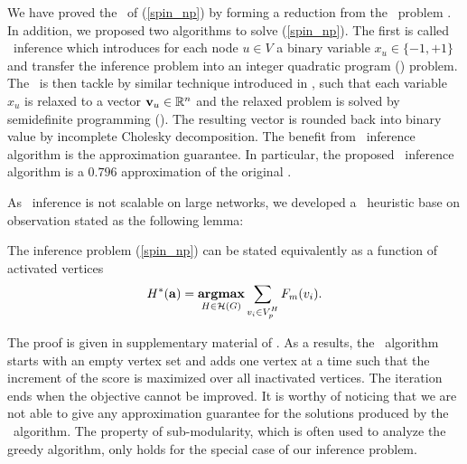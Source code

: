 {We have proved the \nphardness\ of (\ref{spin_np}) by forming a reduction from the \maxcut\ problem \citep{Garey90computers}.
In addition, we proposed two algorithms to solve (\ref{spin_np}).
The first is called {\sdp\ inference} which introduces for each node $u\in V$ a binary variable $x_u\in\{-1,+1\}$ and transfer the inference problem into an integer quadratic program (\iqp) problem.
The \iqp\ is then tackle by similar technique introduced in \citep{Geomans1995improved}, such that each variable $x_u$ is relaxed to a vector $\mathbf {v}_u\in\mathbb{R}^n$ and the relaxed problem is solved by semidefinite programming (\sdp). 
The resulting vector is rounded back into binary value by incomplete Cholesky decomposition.
The benefit from \sdp\ inference algorithm is the approximation guarantee. 
In particular, the proposed \sdp\ inference algorithm is a $0.796$ approximation of the original \iqp.

As \sdp\ inference is not scalable on large networks, we developed a \greedy\ heuristic base on observation stated as the following lemma:
\begin{lemma}
	The inference problem (\ref{spin_np}) can be stated equivalently as a function of activated vertices
	\begin{align*}
		H^{*}(\mathbf {a}) = \underset{{H \in {\cal H}(G)}}{\textbf{argmax}} \sum_{ \substack{v_i\in V^H_{\sc p}}}F_m(v_i). \nonumber 
	\end{align*}
\end{lemma}
The proof is given in supplementary material of . 
As a results, the \greedy\ algorithm starts with an empty vertex set and adds one vertex at a time such that the increment of the score is maximized over all inactivated vertices.
The iteration ends when the objective cannot be improved.  
It is worthy of noticing that we are not able to give any approximation guarantee for the solutions produced by the \greedy\ algorithm.
The property of sub-modularity, which is often used to analyze the greedy algorithm, only holds for the special case of our inference problem.


}
